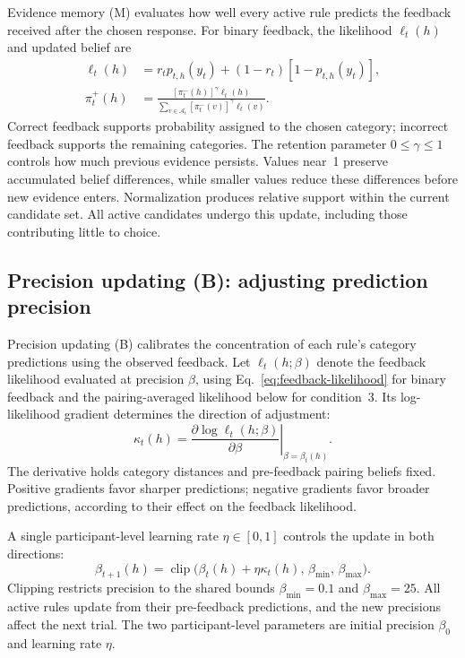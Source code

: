 Evidence memory (M) evaluates how well every active rule predicts the feedback received after the chosen response. For binary feedback, the likelihood $\ell_t(h)$ and updated belief are
\begin{align}
\ell_t(h)&=r_t p_{t,h}(y_t)+(1-r_t)[1-p_{t,h}(y_t)],
\label{eq:feedback-likelihood}\\
\pi_t^+(h)&=
\frac{[\pi_t^-(h)]^{\gamma}\ell_t(h)}
{\sum_{v\in\mathcal A_t}[\pi_t^-(v)]^{\gamma}\ell_t(v)}.
\label{eq:evidence-memory}
\end{align}
Correct feedback supports probability assigned to the chosen category; incorrect feedback supports the remaining categories. The retention parameter $0\leq\gamma\leq1$ controls how much previous evidence persists. Values near~1 preserve accumulated belief differences, while smaller values reduce these differences before new evidence enters. Normalization produces relative support within the current candidate set. All active candidates undergo this update, including those contributing little to choice.

\subsection*{Precision updating (B): adjusting prediction precision}
\label{m:precision}
Precision updating (B) calibrates the concentration of each rule's category predictions using the observed feedback. Let $\ell_t(h;\beta)$ denote the feedback likelihood evaluated at precision $\beta$, using Eq.~\eqref{eq:feedback-likelihood} for binary feedback and the pairing-averaged likelihood below for condition~3. Its log-likelihood gradient determines the direction of adjustment:
\begin{equation}
\kappa_t(h)
=\left.\frac{\partial\log\ell_t(h;\beta)}{\partial\beta}\right|_{\beta=\beta_t(h)}.
\label{eq:precision-gradient}
\end{equation}
The derivative holds category distances and pre-feedback pairing beliefs fixed. Positive gradients favor sharper predictions; negative gradients favor broader predictions, according to their effect on the feedback likelihood.

A single participant-level learning rate $\eta\in[0,1]$ controls the update in both directions:
\begin{equation}
\beta_{t+1}(h)=\operatorname{clip}
\bigl(\beta_t(h)+\eta\kappa_t(h),\,\beta_{\min},\,\beta_{\max}\bigr).
\label{eq:precision-update}
\end{equation}
Clipping restricts precision to the shared bounds $\beta_{\min}=0.1$ and $\beta_{\max}=25$. All active rules update from their pre-feedback predictions, and the new precisions affect the next trial. The two participant-level parameters are initial precision $\beta_0$ and learning rate $\eta$.

